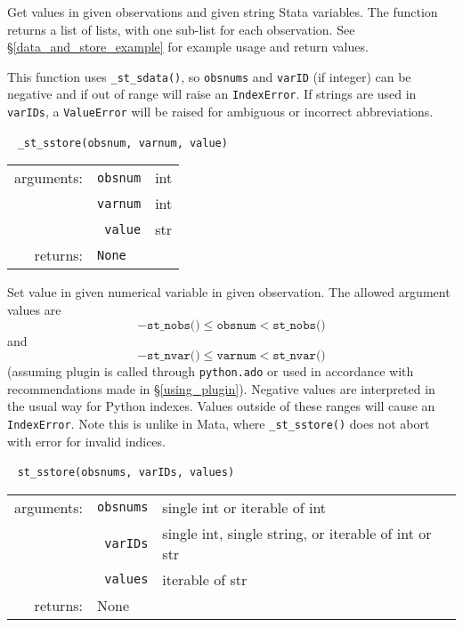 \documentclass{article}
\begin{document}
			\vspace{1.5mm}
			\noindent Get values in given observations and given string Stata variables. The function returns a list of lists, with one sub-list for each observation. See \S\ref{data_and_store_example} for example usage and return values. 
			
			This function uses \lstinline{_st_sdata()}, so \lstinline{obsnums} and \lstinline{varID} (if integer) can be negative and if out of range will raise an \lstinline{IndexError}. If strings are used in \lstinline{varIDs}, a \lstinline{ValueError} will be raised for ambiguous or incorrect abbreviations. \newline
			
			
			\ \newline
			\noindent \lstinline$_st_sstore(obsnum, varnum, value)$
								
			\vspace{1.5mm}
			\noindent 
			\indent \begin{tabular}{rrl}
					arguments: & \texttt{obsnum} & int \\
					  & \texttt{varnum} & int \\						
						& \texttt{value} & str \\
					returns: & \multicolumn{2}{l}{\texttt{None}}
				\end{tabular}
								
			\vspace{1.5mm}
			\noindent Set value in given numerical variable in given observation. The allowed argument values are 
			\[
				-\texttt{st\_nobs()} \leq \texttt{obsnum} < \texttt{st\_nobs()}
			\]
			and
			\[
				-\texttt{st\_nvar()} \leq \texttt{varnum} < \texttt{st\_nvar()}
			\]
			(assuming plugin is called through \lstinline$python.ado$ or used in accordance with recommendations made in \S\ref{using_plugin}). Negative values are interpreted in the usual way for Python indexes. Values outside of these ranges will cause an \lstinline$IndexError$. Note this is unlike in Mata, where \lstinline{_st_sstore()} does not abort with error for invalid indices. \newline
			
			
			\ \newline
			\noindent \lstinline$st_sstore(obsnums, varIDs, values)$
								
			\vspace{1.5mm}
			\noindent 
			\indent \begin{tabular}{rrl}
					arguments: & \texttt{obsnums} & single int or iterable of int \\
						& \texttt{varIDs} & single int, single string, or iterable of int or str \\
						& \texttt{values} & iterable of str \\
					returns: & \multicolumn{2}{l}{None}
				\end{tabular}
								
\end{document}
